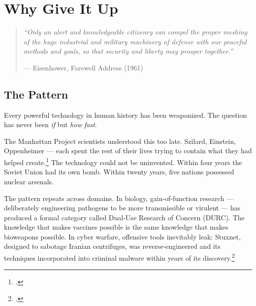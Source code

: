 
\chapter{Why Give It Up}
\label{pos22:why-give-it-up}

\begin{quote}\small\textit{%
``Only an alert and knowledgeable citizenry can compel the proper meshing of the huge industrial and military machinery of defense with our peaceful methods and goals, so that security and liberty may prosper together.''%
}\par\raggedleft --- Eisenhower, Farewell Address (1961)\end{quote}

\vspace{0.5cm}




\section*{The Pattern}
\label{pos22:the-pattern}

Every powerful technology in human history has been weaponized. The question has never been \textit{if} but \textit{how fast}.

The Manhattan Project scientists understood this too late. Szilard, Einstein, Oppenheimer --- each spent the rest of their lives trying to contain what they had helped create.\footcite{rhodes1986} The technology could not be uninvented. Within four years the Soviet Union had its own bomb. Within twenty years, five nations possessed nuclear arsenals.

The pattern repeats across domains. In biology, gain-of-function research --- deliberately engineering pathogens to be more transmissible or virulent --- has produced a formal category called Dual-Use Research of Concern (DURC). The knowledge that makes vaccines possible is the same knowledge that makes bioweapons possible. In cyber warfare, offensive tools inevitably leak: Stuxnet, designed to sabotage Iranian centrifuges, was reverse-engineered and its techniques incorporated into criminal malware within years of its discovery.\footcite{zetter2014}

